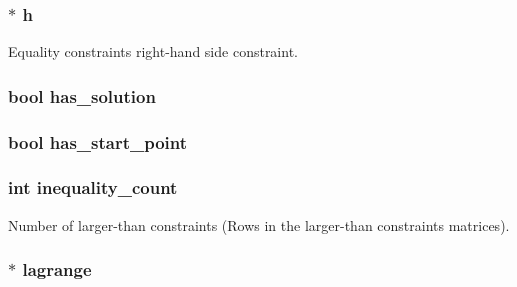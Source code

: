\subsubsection[{h}]{$\ast$ h}\label{structproblem_a8e142e0ead965e30c731cac0c81f0546}
Equality constraints right-\/hand side constraint. \hypertarget{structproblem_af593a3f5fcf12e8513374bc6475a53d4}{}
\subsubsection[{has\+\_\+solution}]{\setlength{\rightskip}{0pt plus 5cm}bool has\+\_\+solution}\label{structproblem_af593a3f5fcf12e8513374bc6475a53d4}
\hypertarget{structproblem_a2596cd297f65ddbda474ea881a09a9e9}{}
\subsubsection[{has\+\_\+start\+\_\+point}]{\setlength{\rightskip}{0pt plus 5cm}bool has\+\_\+start\+\_\+point}\label{structproblem_a2596cd297f65ddbda474ea881a09a9e9}
\hypertarget{structproblem_a0baf6f65eaae279a86d187ef201c1320}{}
\subsubsection[{inequality\+\_\+count}]{\setlength{\rightskip}{0pt plus 5cm}int inequality\+\_\+count}\label{structproblem_a0baf6f65eaae279a86d187ef201c1320}
Number of larger-\/than constraints (Rows in the larger-\/than constraints matrices). \hypertarget{structproblem_a988084bf1423637718de8882244149f4}{}
\subsubsection[{lagrange}]{$\ast$ lagrange}\label{structproblem_a988084bf1423637718de8882244149f4}
\hypertarget{structproblem_a53380b3b14c20bdfcb3bc9970c421231}{}
